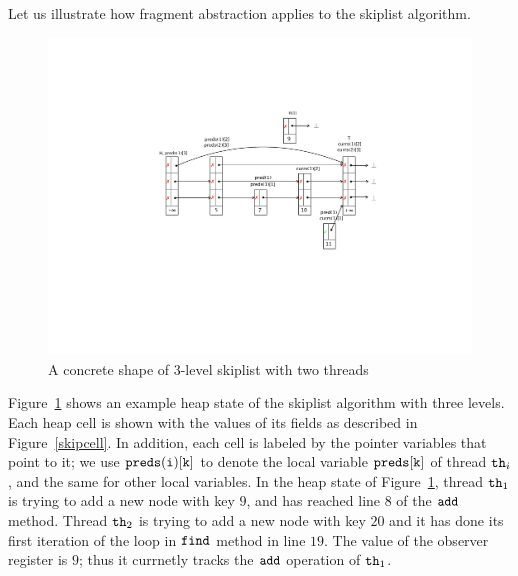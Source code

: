 Let us illustrate how fragment abstraction applies to the skiplist
algorithm.
\begin{figure}
\vspace*{-0.6cm}
\center  
 \includegraphics[width=1.2\textwidth, trim={7cm 8cm 0.5cm 6cm}, clip]{skipshape.pdf}  
\vspace*{-0.6cm}
 \caption{A concrete shape of 3-level skiplist with two threads}
\label{sl-shape}
\vspace*{-0.6cm}
\end{figure}
Figure~\ref{sl-shape} shows an example heap state of the
skiplist algorithm with three levels. Each heap cell is shown with the values of its fields as described in Figure~\ref{skipcell}. %
In addition, each cell is labeled by the
pointer variables that point to it; we use ${\tt preds(i)[k]}$ to denote the local
variable ${\tt preds[k]}$ of thread ${\tt th}_i$, and the same for other local variables.
In the heap state of Figure~\ref{sl-shape}, thread ${\tt th}_1$ is trying to add a new node with key $9$, and has reached line $8$ of the $\tt add$ method. Thread ${\tt th}_2$ is trying to add a new node with key $20$ and it has done its first iteration of the loop in $\tt find$ method in line $19$. The value of the observer register is $9$; thus it currnetly tracks the $\tt add$ operation of ${\tt th}_1$.





